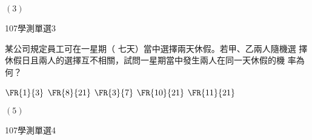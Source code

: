 \begin{QUESTIONS}
\begin{QUESTION}
\begin{QBODY}
        \end{QBODY}
        \begin{QFROMS}
        \end{QFROMS}
        \begin{QTAGS}\end{QTAGS}
        \begin{QANS}
            $(3)$
        \end{QANS}
        \begin{QSOLLIST}
        \end{QSOLLIST}
        \begin{QEMPTYSPACE}
        \end{QEMPTYSPACE}
    \end{QUESTION}
    \begin{QUESTION}
        \begin{ExamInfo}{107}{學測}{單選}{3}
        \end{ExamInfo}
        \begin{ExamAnsRateInfo}{}{}{}{}
        \end{ExamAnsRateInfo}
        \begin{QBODY}
            某公司規定員工可在一星期（ 七天）當中選擇兩天休假。若甲、乙兩人隨機選
            擇休假日且兩人的選擇互不相關，試問一星期當中發生兩人在同一天休假的機
            率為何？
            \begin{QOPS}
                \QOP $\FR{1}{3}$
                \QOP $\FR{8}{21}$
                \QOP $\FR{3}{7}$
                \QOP $\FR{10}{21}$
                \QOP $\FR{11}{21}$
            \end{QOPS}
        \end{QBODY}
        \begin{QFROMS}
        \end{QFROMS}
        \begin{QTAGS}\end{QTAGS}
        \begin{QANS}
            $(5)$
        \end{QANS}
        \begin{QSOLLIST}
        \end{QSOLLIST}
        \begin{QEMPTYSPACE}
        \end{QEMPTYSPACE}
    \end{QUESTION}
    \begin{QUESTION}
        \begin{ExamInfo}{107}{學測}{單選}{4}
        \end{ExamInfo}

\end{QUESTION}
\end{QUESTIONS}
